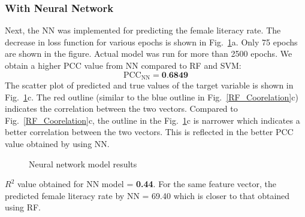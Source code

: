 \documentclass{article}
\begin{document}
\subsubsection{With Neural Network}
Next, the NN was implemented for predicting the female literacy rate. The decrease in loss function for various epochs is shown in Fig.~\ref{NN_Coorelation}a. Only 75 epochs are shown in the figure. Actual model was run for more than 2500 epochs. We obtain a higher  PCC value from NN compared to RF and SVM:
\begin{equation*}
\text{PCC}_\text{NN} = \textbf{0.6849}
\end{equation*} 
The scatter plot of predicted and true values of the target variable is shown in Fig.~\ref{NN_Coorelation}c. The red outline (similar to the blue outline in Fig.~\ref{RF_Coorelation}c) indicates the correlation between the two vectors. Compared to Fig.~\ref{RF_Coorelation}c, the outline in the Fig.~\ref{NN_Coorelation}c is narrower which indicates a better correlation between the two vectors. This is reflected in the better PCC value obtained by using NN. 
\begin{figure}[H]
	\centering
	\caption{Neural network model results}
	\label{NN_Coorelation}
\end{figure}
$R^2$ value obtained for NN model =\textbf{ 0.44}. For the same feature vector, the predicted female literacy rate by NN = 69.40 which is closer to that obtained using RF.
\end{document}
